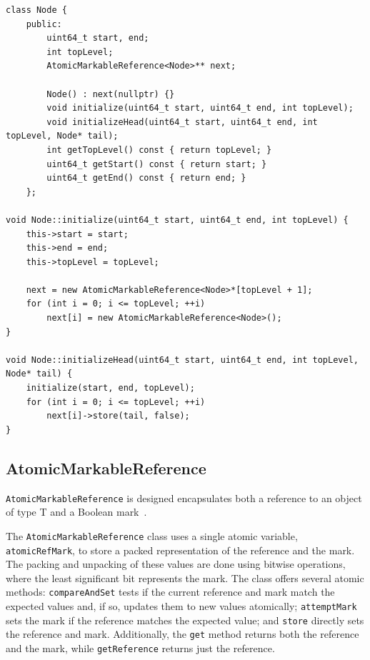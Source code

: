 \begin{lstlisting}[style=mystyle, caption=Node structure]
class Node {
    public:
        uint64_t start, end;
        int topLevel;
        AtomicMarkableReference<Node>** next;
    
        Node() : next(nullptr) {}
        void initialize(uint64_t start, uint64_t end, int topLevel);
        void initializeHead(uint64_t start, uint64_t end, int topLevel, Node* tail);
        int getTopLevel() const { return topLevel; }
        uint64_t getStart() const { return start; }
        uint64_t getEnd() const { return end; }
    };
    
void Node::initialize(uint64_t start, uint64_t end, int topLevel) {
    this->start = start;
    this->end = end;
    this->topLevel = topLevel;

    next = new AtomicMarkableReference<Node>*[topLevel + 1];
    for (int i = 0; i <= topLevel; ++i)
        next[i] = new AtomicMarkableReference<Node>();
}

void Node::initializeHead(uint64_t start, uint64_t end, int topLevel, Node* tail) {
    initialize(start, end, topLevel);
    for (int i = 0; i <= topLevel; ++i)
        next[i]->store(tail, false);
}
\end{lstlisting}

\subsection{AtomicMarkableReference} \label{AtomicMarkableReference}

\texttt{AtomicMarkableReference} is designed encapsulates both a reference to an object of type T and a Boolean mark~\parencite{atomicMarkableReference}.

The \texttt{AtomicMarkableReference} class uses a single atomic variable, \texttt{atomicRefMark}, to store a packed representation of the reference and the mark. The packing and unpacking of these values are done using bitwise operations, where the least significant bit represents the mark. The class offers several atomic methods: \texttt{compareAndSet} tests if the current reference and mark match the expected values and, if so, updates them to new values atomically; \texttt{attemptMark} sets the mark if the reference matches the expected value; and \texttt{store} directly sets the reference and mark. Additionally, the \texttt{get} method returns both the reference and the mark, while \texttt{getReference} returns just the reference.

